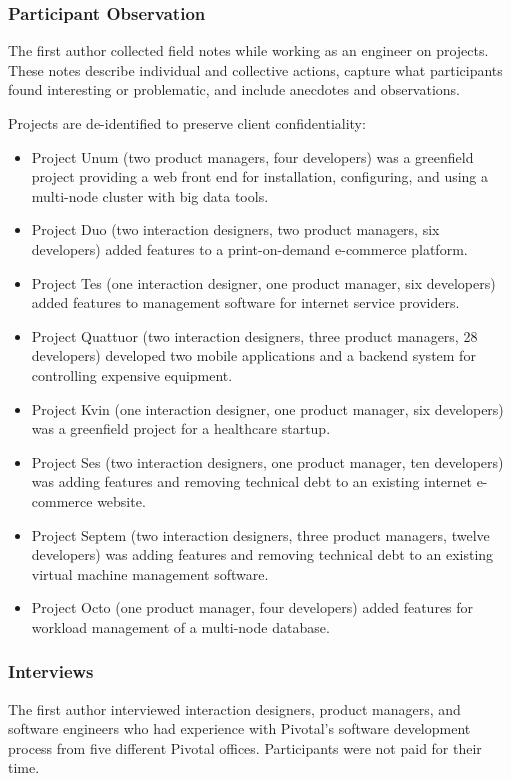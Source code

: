 \subsubsection{Participant Observation}
The first author collected field notes while working as an engineer on \numberOfObservedProjects{} projects. These notes describe individual and collective actions, capture what participants found interesting or problematic, and include anecdotes and observations.

Projects are de-identified to preserve client confidentiality:

\begin{itemize}
\item Project Unum (two product managers, four developers) was a greenfield project providing a web front end for installation, configuring, and using a multi-node cluster with big data tools. 
\item Project Duo (two interaction designers, two product managers, six developers) added features to a print-on-demand e-commerce platform. 
\item Project Tes (one interaction designer, one product manager, six developers) added features to management software for internet service providers.
\item Project Quattuor (two interaction designers, three product managers, 28 developers) developed two mobile applications and a backend system for controlling expensive equipment.
\item Project Kvin (one interaction designer, one product manager, six developers) was a greenfield project for a healthcare startup. 
\item Project Ses (two interaction designers, one product manager, ten developers) was adding features and removing technical debt to an existing internet e-commerce website.
\item Project Septem (two interaction designers, three product managers, twelve developers) was adding features and removing technical debt to an existing virtual machine management software.
\item Project Octo (one product manager, four developers) added features for workload management of a multi-node database.
\end{itemize}
\subsubsection{Interviews}
The first author interviewed \numberOfInterviews{} interaction designers, product managers, and software engineers who had experience with Pivotal's software development process from five different Pivotal offices. Participants were not paid for their time.

